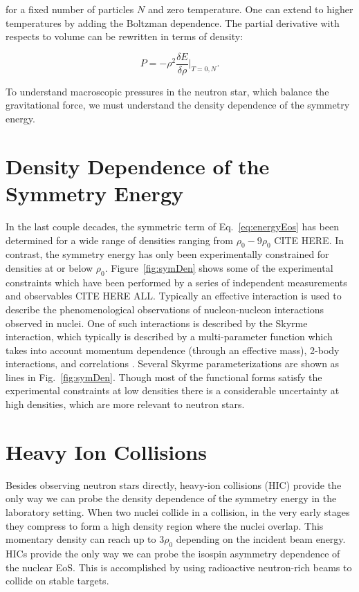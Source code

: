 for a fixed number of particles $N$ and zero temperature. One can extend to higher temperatures by adding the Boltzman dependence. The partial derivative with respects to volume can be rewritten in terms of density:

\begin{equation}
P = -\rho^2 \frac{\delta E}{\delta \rho}\vert_{T=0,N}.
\label{eq:densEos}
\end{equation}

To understand macroscopic pressures in the neutron star, which balance the gravitational force, we must understand the density dependence of the symmetry energy. 

\section{Density Dependence of the Symmetry Energy}
In the last couple decades, the symmetric term of Eq.~\ref{eq:energyEos} has been determined for a wide range of densities ranging from $\rho_0 - 9\rho_0$ CITE HERE. In contrast, the symmetry energy has only been experimentally constrained for densities at or below $\rho_0$. Figure~\ref{fig:symDen} shows some of the experimental constraints which have been performed by a series of independent measurements and observables CITE HERE ALL. Typically an effective interaction is used to describe the phenomenological observations of nucleon-nucleon interactions observed in nuclei. One of such interactions is described by the Skyrme interaction, which typically is described by a multi-parameter function which takes into account momentum dependence (through an effective mass), 2-body interactions, and correlations \cite{skyrme}. Several Skyrme parameterizations are shown as lines in Fig.~\ref{fig:symDen}. Though most of the functional forms satisfy the experimental constraints at low densities there is a considerable uncertainty at high densities, which are more relevant to neutron stars. 




\section{Heavy Ion Collisions}
Besides observing neutron stars directly, heavy-ion collisions (HIC) provide the only way we can probe the density dependence of the symmetry energy in the laboratory setting. When two nuclei collide in a collision, in the very early stages they compress to form a high density region where the nuclei overlap. This momentary density can reach up to $3\rho_0$ depending on the incident beam energy. HICs provide the only way we can probe the isospin asymmetry dependence of the nuclear EoS. This is accomplished by using radioactive neutron-rich beams to collide on stable targets. 

